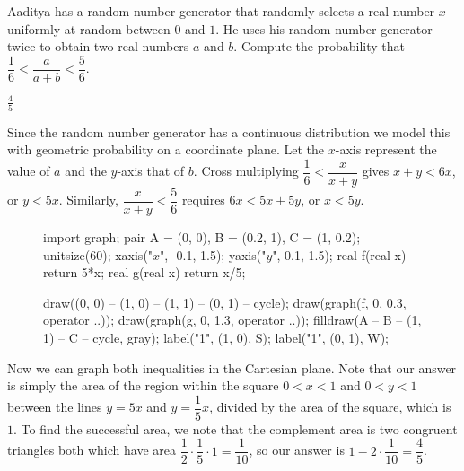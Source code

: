 \documentclass[11pt]{article}
\begin{document}
\begin{problem}
Aaditya has a random number generator that randomly selects a real number $x$ uniformly at random between $0$ and $1$. He uses his random number generator twice to obtain two real numbers $a$ and $b$. Compute the probability that $\dfrac{1}{6} < \dfrac{a}{a+b} < \dfrac{5}{6}$.
\end{problem}

\begin{answer}
$\boxed{\frac{4}{5}}$
\end{answer}

\begin{solution}
Since the random number generator has a continuous distribution we model this with geometric probability on a coordinate plane. Let the $x$-axis represent the value of $a$ and the $y$-axis that of $b$. Cross multiplying $\dfrac{1}{6} < \dfrac{x}{x+y}$ gives $x+y < 6x$, or $y < 5x$. Similarly, $\dfrac{x}{x+y} < \dfrac{5}{6}$ requires $6x < 5x+5y$, or $x < 5y$.

\begin{figure}[H]
	\begin{center}
		\begin{asy}
		import graph;
		pair A = (0, 0), B = (0.2, 1), C = (1, 0.2);
		unitsize(60);
		xaxis("$x$", -0.1, 1.5);
		yaxis("$y$",-0.1, 1.5);
		real f(real x) {return 5*x;}
		real g(real x) {return x/5;}

		draw((0, 0) -- (1, 0) -- (1, 1) -- (0, 1) -- cycle);
		draw(graph(f, 0, 0.3, operator ..));
		draw(graph(g, 0, 1.3, operator ..));
		filldraw(A -- B -- (1, 1) -- C -- cycle, gray);
		label("1", (1, 0), S);
		label("1", (0, 1), W);
		\end{asy}
	\end{center}
\end{figure}

Now we can graph both inequalities in the Cartesian plane. Note that our answer is simply the area of the region within the square $0 < x < 1$ and $0 < y < 1$ between the lines $y=5x$ and $y = \dfrac{1}{5}x$, divided by the area of the square, which is $1$. To find the successful area, we note that the complement area is two congruent triangles both which have area $\dfrac{1}{2} \cdot \dfrac{1}{5} \cdot 1  = \dfrac{1}{10}$, so our answer is $1 - 2 \cdot \dfrac{1}{10} = \boxed{\dfrac{4}{5}}$.
\end{solution}
\end{document}
